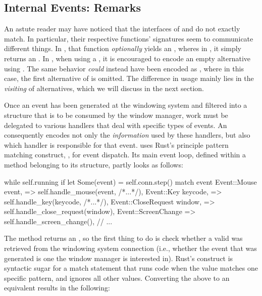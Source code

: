 \subsection{Internal Events: Remarks}

An astute reader may have noticed that the  interfaces of
\wmrs and \wmcpp do not exactly match. In particular, their respective
 functions' signatures seem to communicate different things. In
\wmrs, that function \textit{optionally} yields an , wheres
in \wmcpp, it simply returns an . In \cpp, when using a
, it is encouraged to encode an empty alternative using
\cite{cppstd}. The same behavior \textit{could} instead
have been encoded as , where in this case, the first
alternative of  is omitted. The difference in usage mainly lies in
the \textit{visiting} of  alternatives, which we will discuss in
the next section.


Once an event has been generated at the windowing system and filtered into a
structure that is to be consumed by the window manager, work must be delegated
to various handlers that deal with specific types of events. An 
consequently encodes not only the \textit{information} used by these handlers,
but also which handler is responsible for that event. \wmrs uses Rust's
principle pattern matching construct, , for event dispatch. Its main
event loop, defined within a method belonging to its  structure,
partly looks as follows:

\begin{rustblock}
  while self.running {
    if let Some(event) = self.conn.step() {
      match event {
        Event::Mouse { event, }
          => self.handle_mouse(event, /*...*/),
        Event::Key { keycode, }
          => self.handle_key(keycode, /*...*/),
        Event::CloseRequest { window, }
          => self.handle_close_request(window),
        Event::ScreenChange
          => self.handle_screen_change(),
        // ...
      }
    }
  }
\end{rustblock}

The  method returns an , so the first thing to do
is check whether a valid  was retrieved from the windowing system
connection (i.e., whether the event that was generated is one the window manager
is interested in). Rust's  construct is syntactic sugar for a
match statement that runs code when the value matches one specific pattern, and
ignores all other values\cite{therustbook}. Converting the above 
to an equivalent  results in the following:

